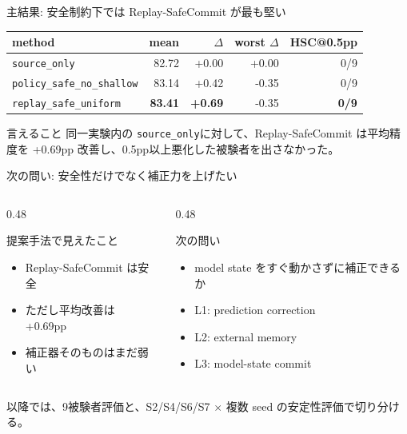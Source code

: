 \documentclass[unicode,aspectratio=169,12pt]{beamer}
\makeatletter
\newcommand{\hsc}{HSC@0.5pp}
\newcommand{\source}{\texttt{source\_only}}
\newcommand{\replay}{\texttt{replay\_safe\_uniform}}
\makeatother
\begin{document}
\begin{frame}{主結果: 安全制約下では Replay-SafeCommit が最も堅い}
  \begin{table}
    \centering
    \begin{tabular}{lrrrr}
      \toprule
      method & mean & $\Delta$ & worst $\Delta$ & \hsc \\
      \midrule
      \source & 82.72 & +0.00 & +0.00 & 0/9 \\
      \texttt{policy\_safe\_no\_shallow} & 83.14 & +0.42 & -0.35 & 0/9 \\
      \replay & \textbf{83.41} & \textbf{+0.69} & -0.35 & \textbf{0/9} \\
      \bottomrule
    \end{tabular}
  \end{table}
  \vspace{0.6em}
  \begin{block}{言えること}
    同一実験内の \source に対して、Replay-SafeCommit は平均精度を +0.69pp 改善し、0.5pp以上悪化した被験者を出さなかった。
  \end{block}
\end{frame}

\begin{frame}{次の問い: 安全性だけでなく補正力を上げたい}
  \begin{columns}[T,onlytextwidth]
    \begin{column}{0.48\textwidth}
      \begin{block}{提案手法で見えたこと}
        \begin{itemize}
          \item Replay-SafeCommit は安全
          \item ただし平均改善は +0.69pp
          \item 補正器そのものはまだ弱い
        \end{itemize}
      \end{block}
    \end{column}
    \begin{column}{0.48\textwidth}
      \begin{alertblock}{次の問い}
        \begin{itemize}
          \item model state をすぐ動かさずに補正できるか
          \item L1: prediction correction
          \item L2: external memory
          \item L3: model-state commit
        \end{itemize}
      \end{alertblock}
    \end{column}
  \end{columns}
  \vspace{0.5em}
  \small
  以降では、9被験者評価と、S2/S4/S6/S7 $\times$ 複数 seed の安定性評価で切り分ける。
\end{frame}
\end{document}
